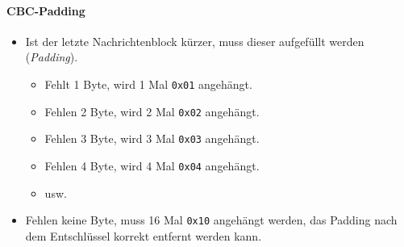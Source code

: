 \documentclass[a4paper, 11pt, accentcolor = tud3b]{tudreport}
\begin{document}
                    \paragraph{CBC-Padding}
                        \begin{itemize}
                        	\item Ist der letzte Nachrichtenblock kürzer, muss dieser aufgefüllt werden (\textit{Padding}).
	                        	\begin{itemize}
	                        		\item Fehlt 1 Byte, wird 1 Mal \texttt{0x01} angehängt.
	                        		\item Fehlen 2 Byte, wird 2 Mal \texttt{0x02} angehängt.
	                        		\item Fehlen 3 Byte, wird 3 Mal \texttt{0x03} angehängt.
	                        		\item Fehlen 4 Byte, wird 4 Mal \texttt{0x04} angehängt.
	                        		\item usw.
	                        	\end{itemize}
                        	\item Fehlen keine Byte, muss 16 Mal \texttt{0x10} angehängt werden, das Padding nach dem Entschlüssel korrekt entfernt werden kann.
                        \end{itemize}
                    
\end{document}
